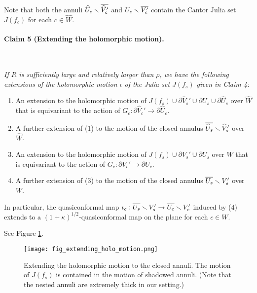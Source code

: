 Note that
both the annuli $\widehat{U}_c \smallsetminus \overline{\widehat{V}_c'}$ 
and $U_c \smallsetminus \overline{V_c'}$ 
contain the Cantor Julia set $J(f_c)$ for each $c \in \widehat{W}$.





\paragraph{\bf Claim 5 (Extending the holomorphic motion).}~
{\it
If $R$ is sufficiently large and relatively larger than $\rho$, 
we have the following extensions of 
the holomorphic motion $\iota$ 
of the Julia set $J(f_s)$ given in Claim 4:
\begin{enumerate}[\rm (1)]
\item
An extension to the holomorphic motion of 
$J(f_s) \cup \partial \widehat{V}_s' \cup \partial U_s
\cup \partial \widehat{U}_s$ over $\widehat{W}$
that is equivariant to the action of 
$G_c:\partial \widehat{V}_c' \to \partial\widehat{U}_c$.
\item
A further extension of {\rm (1)}
to the motion of the closed annulus $\overline{\widehat{U}_s} \smallsetminus \widehat{V}_s'$ over $\widehat{W}$.  
\item
An extension to the holomorphic motion of 
$J(f_s) \cup \partial {V}_s' \cup \partial U_s$ 
over ${W}$
that is equivariant to the action of 
$G_c:\partial {V}_c' \to \partial{U}_c$.
\item
A further extension of {\rm (3)}
to the motion of
the closed annulus $\overline{{U}_s} \smallsetminus {V}_s'$ over ${W}$. 
\end{enumerate}
In particular, the quasiconformal map
$\iota_c: \overline{{U}_s} \smallsetminus {V}_s' \to \overline{{U}_c} \smallsetminus {V}_c'$
induced by {\rm (4)}
extends to a $(1+\kappa)^{1/2}$-quasiconformal map on the plane 
for each $c \in W$.
}

See Figure \ref{fig_extending_holo_motion}.


\begin{figure}[htbp]
\begin{center}
\texttt{[image: fig\_extending\_holo\_motion.png]}
\end{center}
\caption{\small
Extending the holomorphic motion to the closed annuli.
The motion of $J(f_s)$ is contained in the motion of shadowed annuli.
(Note that the nested annuli are extremely thick in our setting.)
}
\label{fig_extending_holo_motion}
\end{figure}
\medskip

